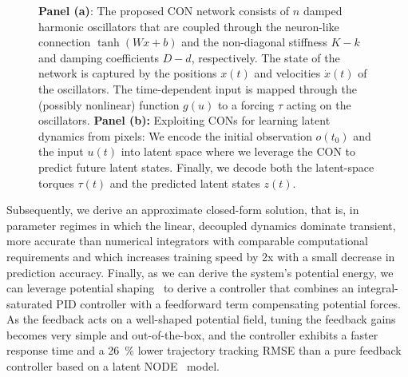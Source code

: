 \begin{figure}[t]
    \centering
    \caption{\textbf{Panel (a)}: The proposed CON network consists of $n$ damped harmonic oscillators that are coupled through the neuron-like connection $\tanh(Wx+b)$ and the non-diagonal stiffness $K-k$ and damping coefficients $D-d$, respectively. The state of the network is captured by the positions $x(t)$ and velocities $\dot{x}(t)$ of the oscillators. The time-dependent input is mapped through the (possibly nonlinear) function $g(u)$ to a forcing $\tau$ acting on the oscillators. 
    \textbf{Panel (b):} Exploiting \glspl{CON} for learning latent dynamics from pixels: We encode the initial observation $o(t_0)$ and the input $u(t)$ into latent space where we leverage the \gls{CON} to predict future latent states. Finally, we decode both the latent-space torques $\tau(t)$ and the predicted latent states $z(t)$.
    }
\end{figure}

Subsequently, we derive an approximate closed-form solution, that is, in parameter regimes in which the linear, decoupled dynamics dominate transient, more accurate than numerical integrators with comparable computational requirements and which increases training speed by 2x with a small decrease in prediction accuracy.
Finally, as we can derive the system's potential energy, we can leverage potential shaping~\cite{bloch2001controlled, ortega2021pid} to derive a controller that combines an integral-saturated PID controller with a feedforward term compensating potential forces.
As the feedback acts on a well-shaped potential field, tuning the feedback gains becomes very simple and out-of-the-box, and the controller exhibits a faster response time and a \SI{26}{\percent} lower trajectory tracking \gls{RMSE} than a pure feedback controller based on a latent \gls{NODE}~\cite{chen2018neural} model.

